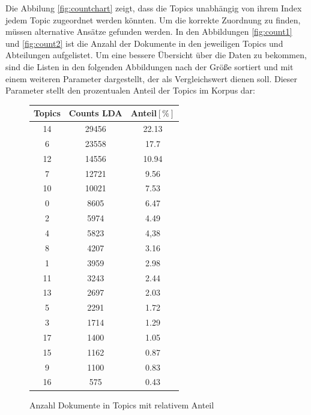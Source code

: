 \documentclass[german,version-2020-11]{uzl-thesis}
\begin{document}
\begin{itemize}
\begin{enumerate}
Die Abbilung \ref{fig:countchart} zeigt, dass die Topics unabhängig von ihrem Index jedem Topic zugeordnet werden könnten. Um die korrekte Zuordnung zu finden, müssen alternative Ansätze gefunden werden. In den Abbildungen \ref{fig:count1} und \ref{fig:count2} ist die Anzahl der Dokumente in den jeweiligen Topics und Abteilungen aufgelistet. Um eine bessere Übersicht über die Daten zu bekommen, sind die Listen in den folgenden Abbildungen nach der Größe sortiert und mit einem weiteren Parameter dargestellt, der als Vergleichswert dienen soll. Dieser Parameter stellt den prozentualen Anteil der Topics im Korpus dar: 

\begin{figure}[H]
\begin{center}
\begin{tabular}{ccc}
\hline 
\hline
Topics & Counts LDA & Anteil$[\%]$\\
\hline
14&29456&22.13\\
6&23558&17.7\\
12&14556&10.94\\
7&12721&9.56\\
10&10021&7.53\\
0&8605&6.47\\
2&5974&4.49\\
4&5823&4,38\\
8&4207&3.16\\
1&3959&2.98\\
11&3243&2.44\\
13&2697&2.03\\
5&2291&1.72\\
3&1714&1.29\\
17&1400&1.05\\
15&1162&0.87\\
9&1100&0.83\\
16&575&0.43\\
\hline
\hline
\end{tabular}
\caption{Anzahl Dokumente in Topics mit relativem Anteil}
\label{fig:count3}
\end{center}
\end{figure}



\end{enumerate}
\end{itemize}
\end{document}
